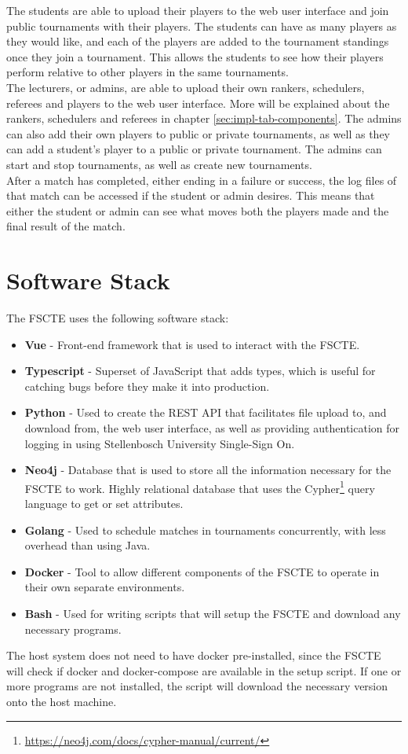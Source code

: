 \documentclass[a4paper, 12pt]{report}
\begin{document}
The students are able to upload their players to the web user interface and join
public tournaments with their players. The students can have as many players as
they would like, and each of the players are added to the tournament standings
once they join a tournament. This allows the students to see how their players
perform relative to other players in the same tournaments. \\

The lecturers, or admins, are able to upload their own rankers, schedulers,
referees and players to the web user interface. More will be explained about the
rankers, schedulers and referees in chapter \ref{sec:impl-tab-components}. The
admins can also add their own players to public or private tournaments, as well
as they can add a student's player to a public or private tournament. The admins
can start and stop tournaments, as well as create new tournaments. \\

After a match has completed, either ending in a failure or success, the log files
of that match can be accessed if the student or admin desires. This means that
either the student or admin can see what moves both the players made and the
final result of the match.

\section{Software Stack}

The FSCTE uses the following software stack:
\begin{itemize}
	\item \textbf{Vue} - Front-end framework that is used to interact with the
	FSCTE.
	\item \textbf{Typescript} - Superset of JavaScript that adds types, which
	is useful for catching bugs before they make it into production.
	\item \textbf{Python} - Used to create the REST API that facilitates
	file upload to, and download from, the web user interface, as well as providing
	authentication for logging in using Stellenbosch University Single-Sign On.
	\item \textbf{Neo4j} - Database that is used to store all the information
	necessary for the FSCTE to work. Highly relational database that uses the
	Cypher\footnote{\url{https://neo4j.com/docs/cypher-manual/current/}} query
	language to get or set attributes.
	\item \textbf{Golang} - Used to schedule matches in tournaments concurrently,
	with less overhead than using Java.
	\item \textbf{Docker} - Tool to allow different components of the FSCTE to
	operate in their own separate environments.
	\item \textbf{Bash} - Used for writing scripts that will setup the FSCTE and
	download any necessary programs.
\end{itemize}
The host system does not need to have docker pre-installed, since the FSCTE will
check if docker and docker-compose are available in the setup script. If one or
more programs are not installed, the script will download the necessary version
onto the host machine.
\end{document}
